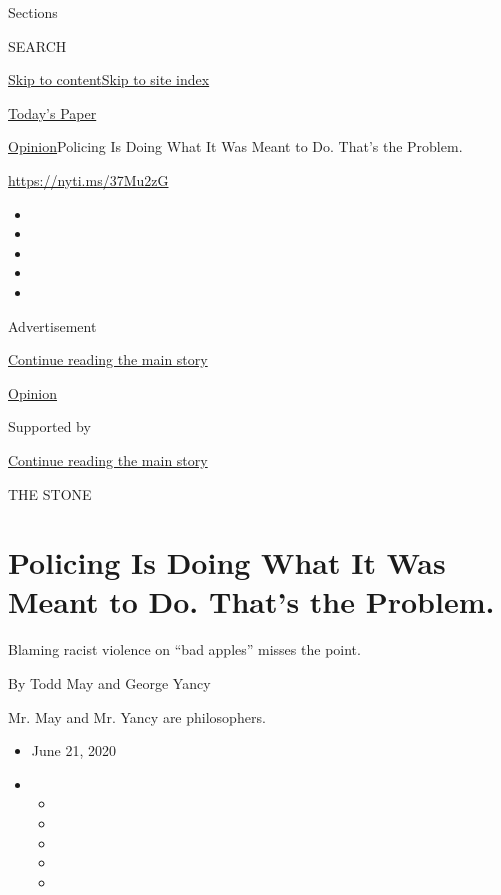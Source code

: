 Sections

SEARCH

\protect\hyperlink{site-content}{Skip to
content}\protect\hyperlink{site-index}{Skip to site index}

\href{https://myaccount.nytimes3xbfgragh.onion/auth/login?response_type=cookie\&client_id=vi}{}

\href{https://www.nytimes3xbfgragh.onion/section/todayspaper}{Today's
Paper}

\href{/section/opinion}{Opinion}\textbar{}Policing Is Doing What It Was
Meant to Do. That's the Problem.

\url{https://nyti.ms/37Mu2zG}

\begin{itemize}
\item
\item
\item
\item
\item
\end{itemize}

Advertisement

\protect\hyperlink{after-top}{Continue reading the main story}

\href{/section/opinion}{Opinion}

Supported by

\protect\hyperlink{after-sponsor}{Continue reading the main story}

THE STONE

\hypertarget{policing-is-doing-what-it-was-meant-to-do-thats-the-problem}{%
\section{Policing Is Doing What It Was Meant to Do. That's the
Problem.}\label{policing-is-doing-what-it-was-meant-to-do-thats-the-problem}}

Blaming racist violence on ``bad apples'' misses the point.

By Todd May and George Yancy

Mr. May and Mr. Yancy are philosophers.

\begin{itemize}
\item
  June 21, 2020
\item
  \begin{itemize}
  \item
  \item
  \item
  \item
  \item
  \end{itemize}
\end{itemize}

